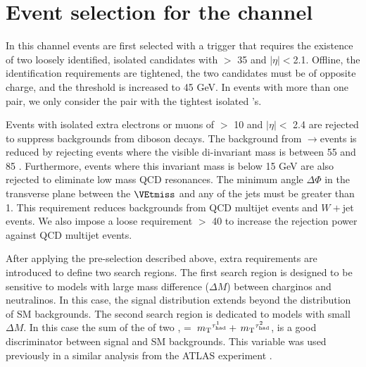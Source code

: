 \section{\texorpdfstring{Event selection for the \Tau\Tau channel}{Event selection for the tau-tau channel}}
\label{sect:tauTauCuts}
In this channel events are first selected with a trigger \cite{CMS:2013hoa,Chatrchyan:2012xi,Chatrchyan:2011nv}
that requires the existence of
two loosely identified, isolated \Tau candidates with \PT $>$ 35 \GeV and $|\eta|<$2.1.   Offline,
the \Tau identification requirements are tightened, the two \Tau candidates must be of
opposite charge, and the \PT threshold is increased to 45 GeV.
In events with more than one \Tau\Tau pair, we only consider the pair with the tightest isolated \Tau's. 

Events with isolated extra electrons or muons of \PT $>$ 10 \GeV and $|\eta| <$ 2.4 
are rejected to suppress %
backgrounds from diboson decays.
The background from \Z$\rightarrow$\Tau\Tau events is reduced by rejecting events where the visible
di-\Tau invariant mass is between 55 and 85 \GeV.  Furthermore, events where this invariant mass is below 15 GeV
are also rejected to eliminate low mass QCD resonances.
The minimum angle $\Delta \Phi$
in the transverse plane between the $\VEtmiss$ and any of the jets %
must be greater than 1.  This requirement reduces backgrounds from QCD multijet events and $W+$jet events.
We also impose a loose requirement \mttwo $>$ 40 \GeV to increase the rejection power against QCD multijet events.


After applying the pre-selection described above,
extra requirements are introduced to define two search regions.
The first search region is designed to be sensitive to models
with large mass difference ($\Delta M$) between charginos and neutralinos.
In this case, the \mttwo signal distribution extends beyond the 
distribution of SM backgrounds.
The second search region is dedicated to models with small $\Delta M$.  In this case
the sum of the \mt of two \Tau, \SumMT = $\,{m_{\rm T}}^{\tau_{\rm had}^1} + \,{m_{\rm T}}^{\tau_{\rm had}^2}$, is a good discriminator
between signal and SM backgrounds. 
This variable was used previously in a similar analysis from the ATLAS experiment \cite{Aad:2014yka}.


